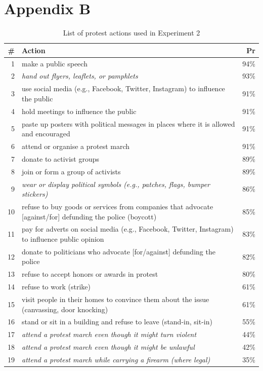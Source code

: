 \documentclass[12pt, letterpaper]{article}
\begin{document}
\begin{table}

\section{Appendix B}

\caption{List of protest actions used in Experiment 2}
\small
\begin{tabularx}{\linewidth}{rXr}
\addlinespace
\toprule
\# & Action & Pr\\
\midrule
1 & make a public speech & 94\%\\
2 & \textit{hand out flyers, leaflets, or pamphlets} & 93\%\\
3 & use social media (e.g., Facebook, Twitter, Instagram) to influence the public & 91\%\\
4 & hold meetings to influence the public & 91\%\\
5 & paste up posters with political messages in places where it is allowed and encouraged & 91\%\\
6 & attend or organise a protest march & 91\%\\
7 & donate to activist groups & 89\%\\
8 & join or form a group of activists & 89\%\\
9 & \textit{wear or display political symbols (e.g., patches, flags, bumper stickers)} & 86\%\\
10 & refuse to buy goods or services from companies that advocate [against/for] defunding the police (boycott) & 85\%\\
11 & pay for adverts on social media (e.g., Facebook, Twitter, Instagram) to influence public opinion & 83\%\\
12 & donate to politicians who advocate [for/against] defunding the police & 82\%\\
13 & refuse to accept honors or awards in protest & 80\%\\
14 & refuse to work (strike) & 61\%\\
15 & visit people in their homes to convince them about the issue (canvassing, door knocking) & 61\%\\
16 & stand or sit in a building and refuse to leave (stand-in, sit-in) & 55\%\\
17 & \textit{attend a protest march even though it might turn violent} & 44\%\\
18 & \textit{attend a protest march even though it might be unlawful} & 42\%\\
19 & \textit{attend a protest march while carrying a firearm (where legal)} & 35\%\\

\end{tabularx}
\end{table}
\end{document}
